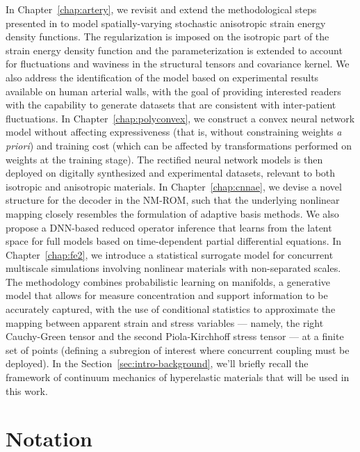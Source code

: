 In Chapter~\ref{chap:artery}, we revisit and extend the methodological steps presented in \cite{STABER201894} to model spatially-varying stochastic anisotropic strain energy density functions. The regularization is imposed on the isotropic part of the strain energy density function and the parameterization is extended to account for fluctuations and waviness in the structural tensors and covariance kernel. We also address the identification of the model based on experimental results available on human arterial walls, with the goal of providing interested readers with the capability to generate datasets that are consistent with inter-patient fluctuations. In Chapter~\ref{chap:polyconvex}, we construct a convex neural network model without affecting expressiveness (that is, without constraining weights \textit{a priori}) and training cost (which can be affected by transformations performed on weights at the training stage). The rectified neural network models is then deployed on digitally synthesized and experimental datasets, relevant to both isotropic and anisotropic materials. In Chapter~\ref{chap:cnnae}, we devise a novel structure for the decoder in the NM-ROM, such that the underlying nonlinear mapping closely resembles the formulation of adaptive basis methods. We also propose a DNN-based reduced operator inference that learns from the latent space for full models based on time-dependent partial differential equations. In Chapter~\ref{chap:fe2}, we introduce a statistical surrogate model for concurrent multiscale simulations involving nonlinear materials with non-separated scales. The methodology combines probabilistic learning on manifolds, a generative model that allows for measure concentration and support information to be accurately captured, with the use of conditional statistics to approximate the mapping between apparent strain and stress variables --- namely, the right Cauchy-Green tensor and the second Piola-Kirchhoff stress tensor --- at a finite set of points (defining a subregion of interest where concurrent coupling must be deployed). In the Section~\ref{sec:intro-background}, we'll briefly recall the framework of continuum mechanics of hyperelastic materials that will be used in this work.

\section{Notation}

